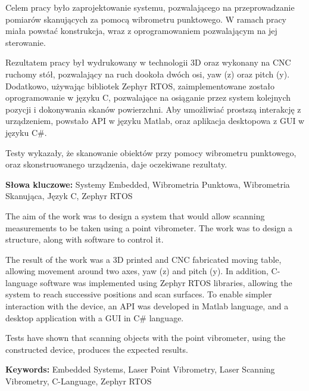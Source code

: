 \documentclass[12pt]{aghdpl}
\author{inż. Jakub Mazur}
\date{2024}
\begin{document}
    \newenvironment{abstractpage}
    {\cleardoublepage\vspace*{\fill}\thispagestyle{empty}}
    {\vfill\cleardoublepage}
    \renewenvironment{abstract}[1]
    {\bigskip\selectlanguage{#1}%
    \begin{center}\bfseries\abstractname\end{center}}
    {\par\bigskip}
	\titlepages

	\begin{abstractpage}
    \begin{abstract}{polish}
        Celem pracy było zaprojektowanie systemu, pozwalającego na przeprowadzanie pomiarów skanujących za pomocą wibrometru punktowego. W ramach pracy miała powstać konstrukcja, wraz z oprogramowaniem pozwalającym na jej sterowanie.

        Rezultatem pracy był wydrukowany w technologii 3D oraz wykonany na CNC ruchomy stół, pozwalający na ruch dookoła dwóch osi, yaw (z) oraz pitch (y). Dodatkowo, używając bibliotek Zephyr RTOS, zaimplementowane zostało oprogramowanie w języku C, pozwalające na osiąganie przez system kolejnych pozycji i dokonywania skanów powierzchni. Aby umożliwiać prostszą interakcję z urządzeniem, powstało API w języku Matlab, oraz aplikacja desktopowa z GUI w języku C\#.

        Testy wykazały, że skanowanie obiektów przy pomocy wibrometru punktowego, oraz skonstruowanego urządzenia, daje oczekiwane rezultaty.
        
        \bigskip
        \textbf{Słowa kluczowe:} Systemy Embedded, Wibrometria Punktowa, Wibrometria Skanująca, Język C, Zephyr RTOS
    \end{abstract}
    \begin{abstract}{english}
        The aim of the work was to design a system that would allow scanning measurements to be taken using a point vibrometer. The work was to design a structure, along with software to control it.

        The result of the work was a 3D printed and CNC fabricated moving table, allowing movement around two axes, yaw (z) and pitch (y). In addition, C-language software was implemented using Zephyr RTOS libraries, allowing the system to reach successive positions and scan surfaces. To enable simpler interaction with the device, an API was developed in Matlab language, and a desktop application with a GUI in C\# language.

        Tests have shown that scanning objects with the point vibrometer, using the constructed device, produces the expected results.
        
        \bigskip    
        \textbf{Keywords:} Embedded Systems, Laser Point Vibrometry, Laser Scanning Vibrometry, C-Language, Zephyr RTOS
    \end{abstract}
\end{abstractpage}	
	
\end{document}
